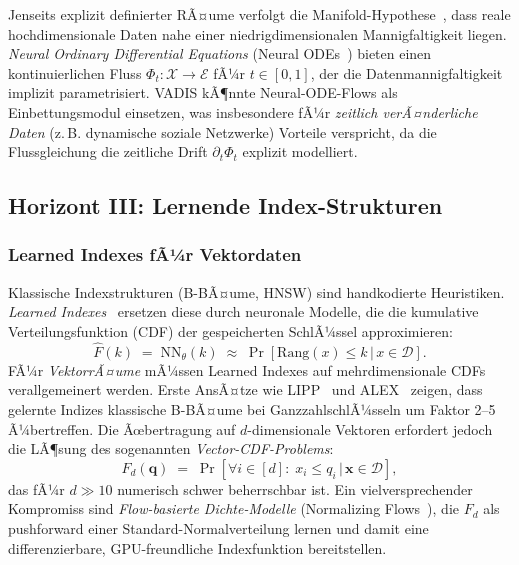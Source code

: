 ﻿\documentclass[12pt,a4paper]{article}
\begin{document}
Jenseits explizit definierter RÃ¤ume verfolgt die
Manifold-Hypothese~\cite{fefferman2016testing},
dass reale hochdimensionale Daten nahe einer
niedrigdimensionalen Mannigfaltigkeit liegen.
\emph{Neural Ordinary Differential Equations}
(Neural ODEs~\cite{chen2018neuralode}) bieten einen
kontinuierlichen Fluss $\Phi_t: \mathcal{X} \to \mathcal{E}$
fÃ¼r $t \in [0,1]$, der die Datenmannigfaltigkeit
implizit parametrisiert. VADIS kÃ¶nnte Neural-ODE-Flows
als Einbettungsmodul einsetzen, was insbesondere
fÃ¼r \emph{zeitlich verÃ¤nderliche Daten} (z.\,B.
dynamische soziale Netzwerke) Vorteile verspricht,
da die Flussgleichung die zeitliche Drift
$\partial_t \Phi_t$ explizit modelliert.

\subsection{Horizont III: Lernende Index-Strukturen}
\label{sub:horizont3}

\subsubsection{Learned Indexes fÃ¼r Vektordaten}

Klassische Indexstrukturen (B-BÃ¤ume, HNSW) sind
handkodierte Heuristiken. \emph{Learned Indexes}~\cite{kraska2018case}
ersetzen diese durch neuronale Modelle, die die
kumulative Verteilungsfunktion (CDF) der gespeicherten
SchlÃ¼ssel approximieren:
\begin{equation}
  \hat{F}(k) \;=\; \text{NN}_\theta(k) \;\approx\;
  \Pr[\text{Rang}(x) \leq k \,|\, x \in \mathcal{D}].
\end{equation}
FÃ¼r \emph{VektorrÃ¤ume} mÃ¼ssen Learned Indexes auf
mehrdimensionale CDFs verallgemeinert werden.
Erste AnsÃ¤tze wie LIPP~\cite{deng2021lipp} und
ALEX~\cite{ding2020alex} zeigen, dass gelernte Indizes
klassische B-BÃ¤ume bei GanzzahlschlÃ¼sseln um
Faktor 2--5 Ã¼bertreffen. Die Ãœbertragung auf
$d$-dimensionale Vektoren erfordert jedoch
die LÃ¶sung des sogenannten \emph{Vector-CDF-Problems}:
\begin{equation}
  F_d(\mathbf{q}) \;=\; \Pr\!\left[
    \forall i \in [d]:\; x_i \leq q_i \,|\, \mathbf{x} \in \mathcal{D}
  \right],
\end{equation}
das fÃ¼r $d \gg 10$ numerisch schwer beherrschbar ist.
Ein vielversprechender Kompromiss sind \emph{Flow-basierte
Dichte-Modelle} (Normalizing Flows~\cite{rezende2015variational}),
die $F_d$ als pushforward einer Standard-Normalverteilung
lernen und damit eine differenzierbare, GPU-freundliche
Indexfunktion bereitstellen.
\end{document}
